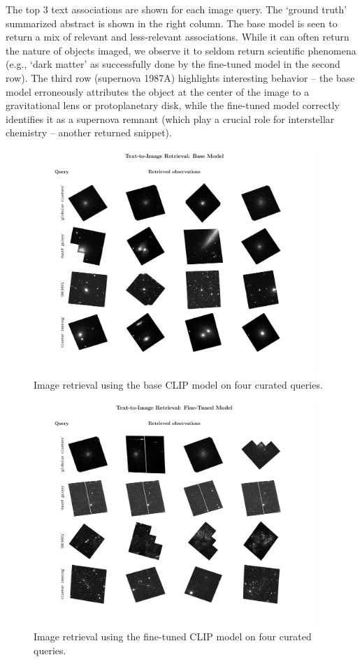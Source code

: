 \documentclass[10pt]{article} %
\begin{document}
The top 3 text associations are shown for each image query. The `ground truth' summarized abstract is shown in the right column. The base model is seen to return a mix of relevant and less-relevant associations. While it can often return the nature of objects imaged, we observe it to seldom return scientific phenomena (e.g., `dark matter' as successfully done by the fine-tuned model in the second row). The third row (supernova 1987A) highlights interesting behavior -- the base model erroneously attributes the object at the center of the image to a gravitational lens or protoplanetary disk, while the fine-tuned model correctly identifies it as a supernova remnant (which play a crucial role for interstellar chemistry -- another returned snippet).


\begin{figure}[!h]
\includegraphics[width=0.95\textwidth]{plots/tti_base.pdf}
\caption{Image retrieval using the base CLIP model on four curated queries.}
\label{fig:tti_base}
\end{figure}

\begin{figure}[!h]
\includegraphics[width=0.95\textwidth]{plots/tti.pdf}
\caption{Image retrieval using the fine-tuned CLIP model on four curated queries.}
\label{fig:tti}
\end{figure}
\end{document}
